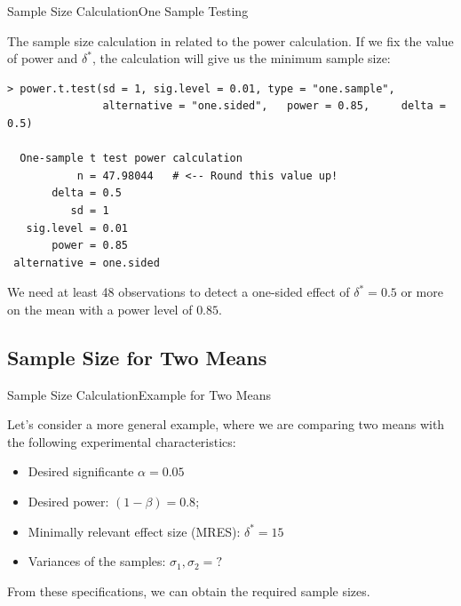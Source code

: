 \begin{frame}[fragile]{Sample Size Calculation}{One Sample Testing}

The sample size calculation in related to the power calculation. If we fix
the value of power and $\delta^*$, the calculation will give us the minimum sample size:

{\smaller
\begin{verbatim}
> power.t.test(sd = 1, sig.level = 0.01, type = "one.sample",
               alternative = "one.sided",   power = 0.85,     delta = 0.5)

  One-sample t test power calculation
           n = 47.98044   # <-- Round this value up!
       delta = 0.5
          sd = 1
   sig.level = 0.01
       power = 0.85
 alternative = one.sided
\end{verbatim}}

We need at least 48 observations to detect a one-sided effect of $\delta^* = 0.5$ or more on the mean with a power level of $0.85$.
\end{frame}



\subsection{Sample Size for Two Means}

\begin{frame}{Sample Size Calculation}{Example for Two Means}

Let's consider a more general example, where we are comparing two means with the following experimental characteristics:\bigskip

\begin{itemize}
  \item Desired significante $\alpha = 0.05$
  \item Desired power: $(1-\beta) = 0.8$;
  \item Minimally relevant effect size (MRES): $\delta^* = 15$
  \item Variances of the samples: $\sigma_1, \sigma_2 = ?$
\end{itemize}\bigskip

From these specifications, we can obtain the required sample sizes.
\end{frame}

